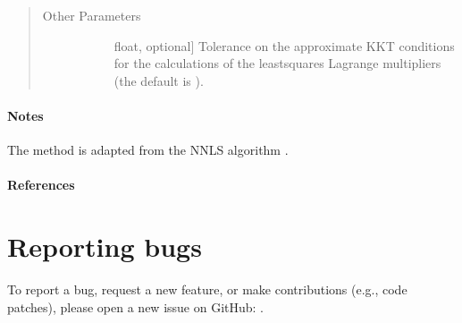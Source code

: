 \documentclass[letterpaper,10pt,english]{sphinxmanual}
\begin{document}
\begin{fulllineitems}
\begin{quote}
\begin{description}
\begin{description}
\end{description}

\item[{Other Parameters}] \leavevmode\begin{description}
\item[{}] \leavevmode{[}float, optional{]}
\sphinxAtStartPar
Tolerance on the approximate KKT conditions for the calculations of the
least\sphinxhyphen{}squares Lagrange multipliers (the default is
).

\end{description}

\end{description}\end{quote}
\subsubsection*{Notes}

\sphinxAtStartPar
The method is adapted from the NNLS algorithm .
\subsubsection*{References}

\sphinxAtStartPar
{}

\end{fulllineitems}



\chapter{Reporting bugs}
\label{\detokenize{bugs:reporting-bugs}}\label{\detokenize{bugs::doc}}
\sphinxAtStartPar
To report a bug, request a new feature, or make contributions
(e.g., code patches), please open a new issue on GitHub:
.
\end{document}
